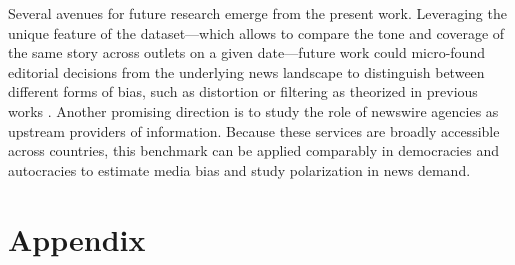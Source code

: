 \documentclass[12pt]{article}
\begin{document}
	Several avenues for future research emerge from the present work. Leveraging the unique feature of the dataset—which allows to compare the tone and coverage of the same story across outlets on a given date—future work could micro-found editorial decisions  from the underlying news landscape to distinguish between different forms of bias, such as distortion or filtering as theorized in previous works \citep[e.g.][]{gentzkow2014media}. Another promising direction is to study the role of newswire agencies as  upstream providers of information.  Because these services are broadly accessible across countries, this benchmark can be applied comparably in democracies and autocracies to estimate media bias and study polarization in news demand.
	
	
	
	
	
	
	
	
	
	
	\clearpage
	
	\pagestyle{plain}  
	
	
	
	
	
	\clearpage
	
	\appendix
	
	\part{Appendix} %
	
\end{document}
